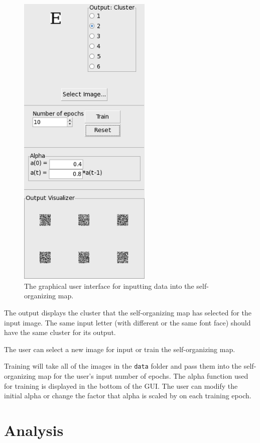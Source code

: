 \documentclass[12pt,letterpaper,oneside]{report}
\newcommand \code[1]{\texttt{#1}}
\begin{document}
\begin{figure}[h]
  \centering
  \includegraphics[width=2.5in]{diagrams/gui-plain.png} 
  \caption{The graphical user interface for inputting data into the self-organizing map.}
  \label{fig:gui-plain}
\end{figure}

The output displays the cluster that the self-organizing map has selected for the input image. The same input letter (with different or the same font face) should have the same cluster for its output.

The user can select a new image for input or train the self-organizing map.

Training will take all of the images in the \code{data} folder and pass them into the self-organizing map for the user's input number of epochs. The alpha function used for training is displayed in the bottom of the GUI. The user can modify the initial alpha or change the factor that alpha is scaled by on each training epoch. 


\clearpage
\section{Analysis}
\end{document}
